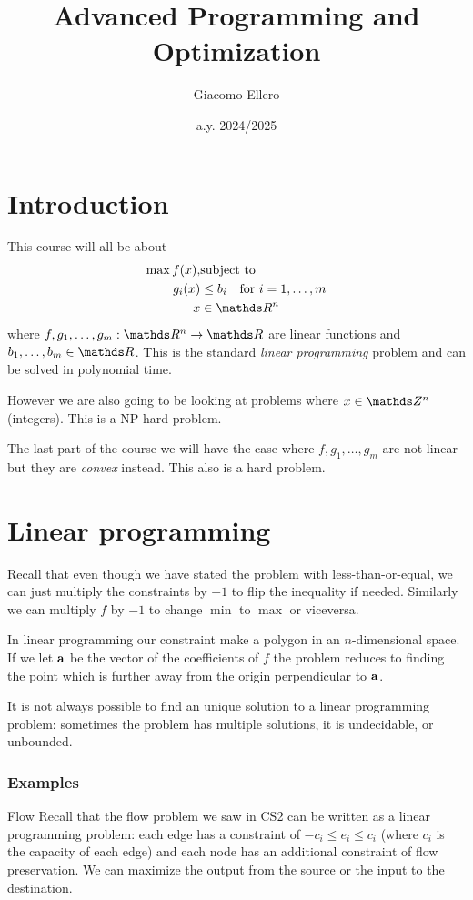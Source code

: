 \documentclass[12pt]{extarticle}
\title{Advanced Programming and Optimization}
\author{Giacomo Ellero}
\date{a.y. 2024/2025}
\renewcommand{\vec}[1]{\bvec{#1}}
\begin{document}
\firstpage

\section{Introduction}

This course will all be about
\begin{align}
	\max f(x), & \text{subject to}                          \\
	g_i(x)     & \leq b_i \quad \text{for } i = 1, \dots, m \\
	x          & \in \R^n
\end{align}
where $f, g_1, \dots, g_m: \R^n \to \R$ are linear functions and $b_1, \dots, b_m \in \R$.
This is the standard \emph{linear programming} problem and can be solved in polynomial time.

However we are also going to be looking at problems where $x \in \Z^n$ (integers).
This is a NP hard problem.

The last part of the course we will have the case where $f, g_1, \dots, g_m$ are not linear
but they are \emph{convex} instead. This also is a hard problem.

\section{Linear programming}

Recall that even though we have stated the problem with less-than-or-equal, we can just multiply
the constraints by $-1$ to flip the inequality if needed.
Similarly we can multiply $f$ by $-1$ to change $\min$ to $\max$ or viceversa.

In linear programming our constraint make a polygon in an $n$-dimensional space.
If we let $\vec a$ be the vector of the coefficients of $f$ the problem reduces to finding the
point which is further away from the origin perpendicular to $\vec a$.

It is not always possible to find an unique solution to a linear programming problem: sometimes
the problem has multiple solutions, it is undecidable, or unbounded.

\subsubsection{Examples}

\begin{example}{Flow}{}
	Recall that the flow problem we saw in CS2 can be written as a linear programming problem:
	each edge has a constraint of $-c_i \leq e_i \leq c_i$ (where $c_i$ is the capacity of each edge)
	and each node has an additional constraint of flow preservation.
	We can maximize the output from the source or the input to the destination.
\end{example}
\end{document}
